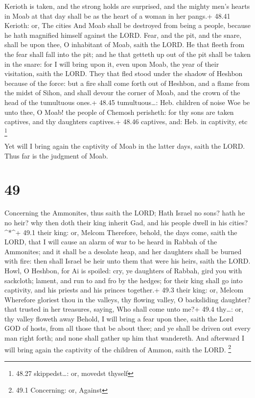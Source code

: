  Kerioth is taken, and the strong holds are surprised, and
the mighty men's hearts in Moab at that day shall be as the heart of a
woman in her pangs.+ 48.41 Kerioth: or, The cities  And
Moab shall be destroyed from being a people, because he hath magnified
himself against the LORD.  Fear, and the pit, and the
snare, shall be upon thee, O inhabitant of Moab, saith the LORD.
 He that fleeth from the fear shall fall into the pit; and
he that getteth up out of the pit shall be taken in the snare: for I
will bring upon it, even upon Moab, the year of their visitation, saith
the LORD.  They that fled stood under the shadow of Heshbon
because of the force: but a fire shall come forth out of Heshbon, and a
flame from the midst of Sihon, and shall devour the corner of Moab, and
the crown of the head of the tumultuous ones.+ 48.45 tumultuous\ldots:
Heb. children of noise  Woe be unto thee, O Moab! the
people of Chemosh perisheth: for thy sons are taken captives, and thy
daughters captives.+ 48.46 captives, and: Heb. in captivity, etc
\footnote{48.27 skippedst\ldots: or, movedst thyself}

 Yet will I bring again the captivity of Moab in the latter
days, saith the LORD. Thus far is the judgment of Moab.

\hypertarget{section-48}{%
\section{49}\label{section-48}}

 Concerning the Ammonites, thus saith the LORD; Hath Israel
no sons? hath he no heir? why then doth their king inherit Gad, and his
people dwell in his cities?\^{}*\^{}+ 49.1 their king: or, Melcom
 Therefore, behold, the days come, saith the LORD, that I
will cause an alarm of war to be heard in Rabbah of the Ammonites; and
it shall be a desolate heap, and her daughters shall be burned with
fire: then shall Israel be heir unto them that were his heirs, saith the
LORD.  Howl, O Heshbon, for Ai is spoiled: cry, ye daughters
of Rabbah, gird you with sackcloth; lament, and run to and fro by the
hedges; for their king shall go into captivity, and his priests and his
princes together.+ 49.3 their king: or, Melcom  Wherefore
gloriest thou in the valleys, thy flowing valley, O backsliding
daughter? that trusted in her treasures, saying, Who shall come unto
me?+ 49.4 thy\ldots: or, thy valley floweth away  Behold, I
will bring a fear upon thee, saith the Lord GOD of hosts, from all those
that be about thee; and ye shall be driven out every man right forth;
and none shall gather up him that wandereth.  And afterward
I will bring again the captivity of the children of Ammon, saith the
LORD. \footnote{49.1 Concerning: or, Against}

